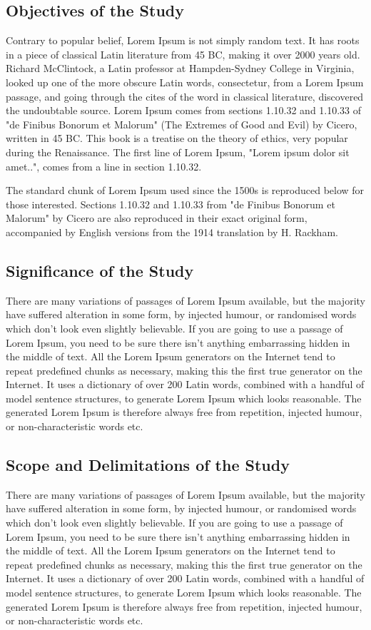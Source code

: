 \subsection{Objectives of the Study}
Contrary to popular belief, Lorem Ipsum\cite{DUMMY:2} is not simply random text. It has roots in a piece of classical Latin literature from 45 BC, making it over 2000 years old. Richard McClintock, a Latin professor at Hampden-Sydney College in Virginia, looked up one of the more obscure Latin words, consectetur, from a Lorem Ipsum passage, and going through the cites of the word in classical literature, discovered the undoubtable source. Lorem Ipsum comes from sections 1.10.32 and 1.10.33 of "de Finibus Bonorum et Malorum" (The Extremes of Good and Evil) by Cicero, written in 45 BC. This book is a treatise on the theory of ethics, very popular during the Renaissance. The first line of Lorem Ipsum, "Lorem ipsum dolor sit amet..", comes from a line in section 1.10.32.

The standard chunk of Lorem Ipsum used since the 1500s is reproduced below for those interested. Sections 1.10.32 and 1.10.33 from "de Finibus Bonorum et Malorum" by Cicero are also reproduced in their exact original form, accompanied by English versions from the 1914 translation by H. Rackham.

\subsection{Significance of the Study}
There are many variations of passages of Lorem Ipsum\cite{DUMMY:3} available, but the majority have suffered alteration in some form, by injected humour, or randomised words which don't look even slightly believable. If you are going to use a passage of Lorem Ipsum, you need to be sure there isn't anything embarrassing hidden in the middle of text. All the Lorem Ipsum generators on the Internet tend to repeat predefined chunks as necessary, making this the first true generator on the Internet. It uses a dictionary of over 200 Latin words, combined with a handful of model sentence structures, to generate Lorem Ipsum which looks reasonable. The generated Lorem Ipsum is therefore always free from repetition, injected humour, or non-characteristic words etc.

\subsection{Scope and Delimitations of the Study}
There are many variations of passages of Lorem Ipsum\cite{DUMMY:3} available, but the majority have suffered alteration in some form, by injected humour, or randomised words which don't look even slightly believable. If you are going to use a passage of Lorem Ipsum, you need to be sure there isn't anything embarrassing hidden in the middle of text. All the Lorem Ipsum generators on the Internet tend to repeat predefined chunks as necessary, making this the first true generator on the Internet. It uses a dictionary of over 200 Latin words, combined with a handful of model sentence structures, to generate Lorem Ipsum which looks reasonable. The generated Lorem Ipsum is therefore always free from repetition, injected humour, or non-characteristic words etc.

